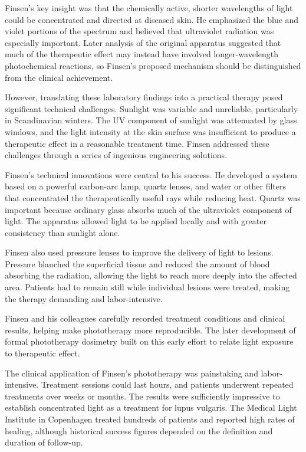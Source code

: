 Finsen's key insight was that the chemically active, shorter wavelengths of light could be concentrated and directed at diseased skin. He emphasized the blue and violet portions of the spectrum and believed that ultraviolet radiation was especially important. Later analysis of the original apparatus suggested that much of the therapeutic effect may instead have involved longer-wavelength photochemical reactions, so Finsen's proposed mechanism should be distinguished from the clinical achievement.\cite{finsen-history}

However, translating these laboratory findings into a practical therapy posed significant technical challenges. Sunlight was variable and unreliable, particularly in Scandinavian winters. The UV component of sunlight was attenuated by glass windows, and the light intensity at the skin surface was insufficient to produce a therapeutic effect in a reasonable treatment time. Finsen addressed these challenges through a series of ingenious engineering solutions.

Finsen's technical innovations were central to his success. He developed a system based on a powerful carbon-arc lamp, quartz lenses, and water or other filters that concentrated the therapeutically useful rays while reducing heat. Quartz was important because ordinary glass absorbs much of the ultraviolet component of light. The apparatus allowed light to be applied locally and with greater consistency than sunlight alone.\cite{finsen-history}

Finsen also used pressure lenses to improve the delivery of light to lesions. Pressure blanched the superficial tissue and reduced the amount of blood absorbing the radiation, allowing the light to reach more deeply into the affected area. Patients had to remain still while individual lesions were treated, making the therapy demanding and labor-intensive.

Finsen and his colleagues carefully recorded treatment conditions and clinical results, helping make phototherapy more reproducible. The later development of formal phototherapy dosimetry built on this early effort to relate light exposure to therapeutic effect.

The clinical application of Finsen's phototherapy was painstaking and labor-intensive. Treatment sessions could last hours, and patients underwent repeated treatments over weeks or months. The results were sufficiently impressive to establish concentrated light as a treatment for lupus vulgaris. The Medical Light Institute in Copenhagen treated hundreds of patients and reported high rates of healing, although historical success figures depended on the definition and duration of follow-up.\cite{finsen-history}

